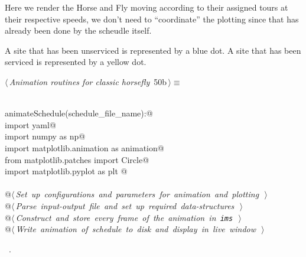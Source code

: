 \documentclass[11.5pt]{report}
\begin{document}
Here we render the Horse and Fly moving according to their 
assigned tours at their respective speeds, we don't 
need to ``coordinate'' the plotting since that has already 
been done by the scheudle itself. 
    
A site that has been unserviced is represented by a blue dot. 
A site that has been serviced is represented by a yellow dot. 
   
\begin{flushleft} \small
\begin{minipage}{\linewidth}\label{scrap63}\raggedright\small
{} $\langle\,${\itshape Animation routines for classic horsefly}\nobreak\ {\footnotesize {50b}}$\,\rangle\equiv$
\vspace{-1ex}
\begin{list}{}{} \item
\mbox{}\verb@@\\
\mbox{}\verb@def animateSchedule(schedule_file_name):@\\
\mbox{}\verb@     import yaml@\\
\mbox{}\verb@     import numpy as np@\\
\mbox{}\verb@     import matplotlib.animation as animation@\\
\mbox{}\verb@     from matplotlib.patches import Circle@\\
\mbox{}\verb@     import matplotlib.pyplot as plt @\\
\mbox{}\verb@@\\
\mbox{}\verb@     @\hbox{$\langle\,${\itshape Set up configurations and parameters for animation and plotting}\nobreak\ {\footnotesize {}}$\,\rangle$}\verb@@\\
\mbox{}\verb@     @\hbox{$\langle\,${\itshape Parse input-output file and set up required data-structures}\nobreak\ {\footnotesize {}}$\,\rangle$}\verb@@\\
\mbox{}\verb@     @\hbox{$\langle\,${\itshape Construct and store every frame of the animation in \verb|ims|}\nobreak\ {\footnotesize {}}$\,\rangle$}\verb@@\\
\mbox{}\verb@     @\hbox{$\langle\,${\itshape Write animation of schedule to disk and display in live window}\nobreak\ {\footnotesize {}}$\,\rangle$}\verb@@\\
\mbox{}\verb@@{\NWsep}
\end{list}
\vspace{-1.5ex}
\footnotesize
\begin{list}{}{\setlength{\itemsep}{-\parsep}\setlength{\itemindent}{-\leftmargin}}
\item \NWtxtMacroRefIn\ .

\item{}
\end{list}
\end{minipage}\vspace{4ex}
\end{flushleft}
\end{document}
